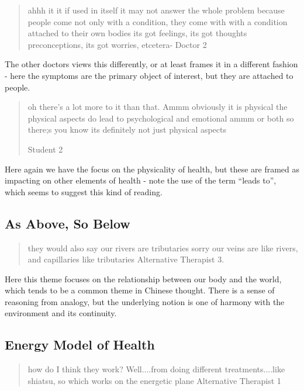 \begin{quotation}
  ahhh it it if used in itself it may not answer the whole problem because people come not only with a condition, they come with with a condition attached to their own bodies its got feelings, its got thoughts preconceptions, its got worries, etcetera-
Doctor 2
\end{quotation}


The other doctors views this differently, or at least frames it in a different fashion - here the symptoms are the primary object of interest, but they are attached to people. 

\begin{quotation}
  oh there's a lot more to it than that. Ammm obviously it is physical the physical aspects do lead to psychological and emotional ammm or both so there;s you know its definitely not just physical aspects 

Student 2
\end{quotation}

Here again we have the focus on the physicality of health, but these are framed as impacting on other elements of health - note the use of the term ``leads to'', which seems to suggest this kind of reading. 


\subsection{As Above, So Below}
\label{sec:as-above-so}

\begin{quotation}
  they would also say our rivers are tributaries sorry our veins are like rivers, and capillaries like tributaries 
Alternative Therapist 3. 
\end{quotation}

Here this theme focuses on the relationship between our body and the world, which tends to be a common theme in Chinese thought. There is a sense of reasoning from analogy, but the underlying notion is one of harmony with the environment and its continuity. 

\subsection{Energy Model of Health}
\label{sec:energy-model-health}

\begin{quotation}
  how do I think they work? Well....from doing different treatments....like shiatsu, so which works on the energetic plane
Alternative Therapist 1
\end{quotation}


